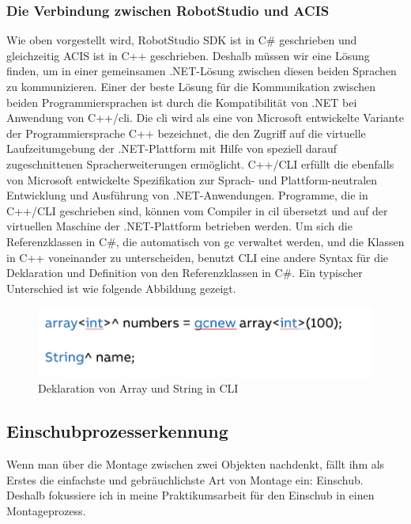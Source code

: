 \documentclass[14pt,a4paper,titlepage]{article}
\begin{document}
			\subsubsection{Die Verbindung zwischen RobotStudio und ACIS}
			Wie oben vorgestellt wird, RobotStudio SDK ist in C\# geschrieben und gleichzeitig ACIS ist in C++ geschrieben. Deshalb müssen wir eine Lösung finden, um in einer gemeinsamen .NET-Lösung zwischen diesen beiden Sprachen zu kommunizieren.
			\bigbreak
			Einer der beste Lösung für die Kommunikation zwischen beiden Programmiersprachen ist durch die Kompatibilität von .NET bei Anwendung von C++/\acs{cli}. Die \ac{cli} wird als eine von Microsoft entwickelte Variante der Programmiersprache C++ bezeichnet, die den Zugriff auf die virtuelle Laufzeitumgebung der .NET-Plattform mit Hilfe von speziell darauf zugeschnittenen Spracherweiterungen ermöglicht.
			C++/CLI erfüllt die ebenfalls von Microsoft entwickelte Spezifikation zur Sprach- und Plattform-neutralen Entwicklung und Ausführung von .NET-Anwendungen. Programme, die in C++/CLI geschrieben sind, können vom Compiler in \ac{cil} übersetzt und auf der virtuellen Maschine der .NET-Plattform betrieben werden.\cite{cli}
			\bigbreak
			Um sich die Referenzklassen in C\#, die automatisch von \ac{gc} verwaltet werden, und die Klassen in C++ voneinander zu unterscheiden, benutzt CLI eine andere Syntax für die Deklaration und Definition von den Referenzklassen in C\#. Ein typischer Unterschied ist wie folgende Abbildung gezeigt.
				\begin{figure}[h!]
				\centering
				\includegraphics[width=0.5\linewidth]{cli.png}
				\caption{Deklaration von Array und String in CLI}
				\end{figure}
		
		\subsection{Einschubprozesserkennung}
		Wenn man über die Montage zwischen zwei Objekten nachdenkt, fällt ihm als Erstes die einfachste und gebräuchlichste Art von Montage ein: Einschub. Deshalb fokussiere ich in meine Praktikumsarbeit für den Einschub in einen Montageprozess. 
\end{document}
